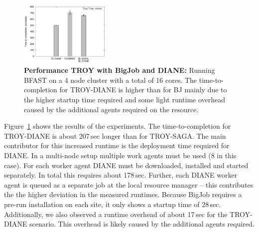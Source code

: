 \documentclass[conference,final]{IEEEtran}
\newcommand{\up}{\vspace*{-1em}}
\begin{document}

\begin{figure}[t]
	\centering
		\includegraphics[width=0.4\textwidth]{perf/perf-bfast-bj.pdf}
	\caption{\textbf{Performance TROY with BigJob and DIANE:} Running BFAST 
	on a 4 node cluster with a total of 16 cores. The time-to-completion for 
	TROY-DIANE is higher than for BJ mainly due to the higher startup 
	time required and some light runtime overhead caused by the additional 
	agents required on the resource.\up\up}
	\label{fig:perf_perf-bfast-bj}
\end{figure}



Figure~\ref{fig:perf_perf-bfast-bj} shows the results of the
experiments. The time-to-completion for TROY-DIANE is about 207\,sec
longer than for TROY-SAGA. The main contributor for this increased
runtime is the deployment time required for DIANE. In a multi-node
setup multiple work agents must be used (8 in this case).  For each
worker agent DIANE must be downloaded, installed and started
separately. In total this requires about 178\,sec. Further, each DIANE
worker agent is queued as a separate job at the local resource manager
-- this contributes the the higher deviation in the measured
runtimes. Because BigJob requires a pre-run installation on each site,
it only shows a startup time of 28\,sec. Additionally, we also
observed a runtime overhead of about 17\,sec for the TROY-DIANE
scenario. This overhead is likely caused by the additional agents
required.

\end{document}
